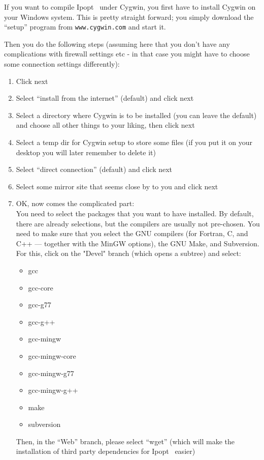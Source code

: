 \documentclass[10pt]{article}
\newcommand{\Ipopt}{{\sc Ipopt }}
\begin{document}
If you want to compile \Ipopt\ under Cygwin, you first have to install
Cygwin on your Windows system.  This is pretty straight forward; you
simply download the ``setup'' program from
\texttt{www.cygwin.com} and start it.

Then you do the following steps (assuming here that you don't have any
complications with firewall settings etc - in that case you might have
to choose some connection settings differently):

\begin{enumerate}
\item Click next
\item Select ``install from the internet'' (default) and click next
\item Select a directory where Cygwin is to be installed (you can
  leave the default) and choose all other things to your liking, then
  click next
\item Select a temp dir for Cygwin setup to store some files (if you
  put it on your desktop you will later remember to delete it)
\item Select ``direct connection'' (default) and click next
\item Select some mirror site that seems close by to you and click next
\item OK, now comes the complicated part:\\
  You need to select the packages that you want to have installed.  By
  default, there are already selections, but the compilers are usually
  not pre-chosen.  You need to make sure that you select the GNU
  compilers (for Fortran, C, and C++ --- together with the MinGW
  options), the GNU Make, and Subversion.  For this, click on the "Devel"
  branch (which opens a subtree) and select:
  \begin{itemize}
  \item gcc
  \item gcc-core
  \item gcc-g77
  \item gcc-g++
  \item gcc-mingw
  \item gcc-mingw-core
  \item gcc-mingw-g77
  \item gcc-mingw-g++
  \item make
  \item subversion
  \end{itemize}

  Then, in the ``Web'' branch, please select ``wget'' (which will make
  the installation of third party dependencies for \Ipopt\ easier)


\end{enumerate}
\end{document}
